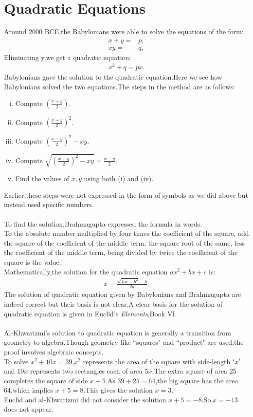 \documentclass[a4paper,reqno,11pt]{book}
\theoremstyle{plain}%
\theoremstyle{definition}
\begin{document}
\section{Quadratic Equations}
Around 2000 BCE,the Babylonians were able to solve the equations of the form:
\begin{align*}
    x+y=&p,\\
    xy=&q,
\end{align*}
Eliminating y,we get a quadratic equation:
\begin{eqnarray*}
    x^2+q=px.
\end{eqnarray*}
Babylonians gave the solution to the quadratic equation.Here we see how Babylonians solved the two equations.The steps in the method are as follows:
\begin{enumerate}[(i)]
    \item Compute $\left(\frac{x+y}{2}\right)$.
    \item Compute $\left(\frac{x+y}{2}\right)^2$.
    \item Compute $\left(\frac{x+y}{2}\right)^2-xy$.
    \item Compute $\sqrt{\left(\frac{x+y}{2}\right)^2-xy}=\frac{x-y}{2}$.
    \item Find the values of $x,y$ using both (i) and (iv).
\end{enumerate}
Earlier,these steps were not expressed in the form of symbols as we did above but instead used specific numbers.\\
\\
To find the solution,Brahmagupta expressed the formula in words:\\
To the absolute number multiplied by four times the coefficient of the square, add the square of the coefficient of the middle term; the square root of the same, less the coefficient of the middle term, being divided by twice the coefficient of the square is the value.\\
Mathematically,the solution for the quadratic equation $ax^2+bx+c$ is:
\begin{eqnarray*}
    x=\frac{\sqrt{4ac-b^2}-b}{2a}.
\end{eqnarray*}
The solution of quadratic equation given by Babylonians and Brahmagupta are indeed correct but their basis is not clear.A clear basis for the solution of quadratic equation is given in Euclid's \emph{Elements},Book VI.\\
\\
Al-Khwarizmi's solution to quadratic equation is generally a transition from geometry to algebra.Though geometry like ``squares" and ``product" are used,the proof involves algebraic concepts.\\
To solve $x^2+10x=39$,$x^2$ represents the area of the square with side-length $`x'$ and $10x$ represents two rectangles each of area $5x$.The extra square of area 25 completes the square of side $x+5$.As $39+25=64$,the big square has the area 64,which implies $x+5=8$.This gives the solution $x=3$.\\
Euclid and al-Khwarizmi did not consider the solution $x+5=-8$.So,$x=-13$ does not appear.
\end{document}
